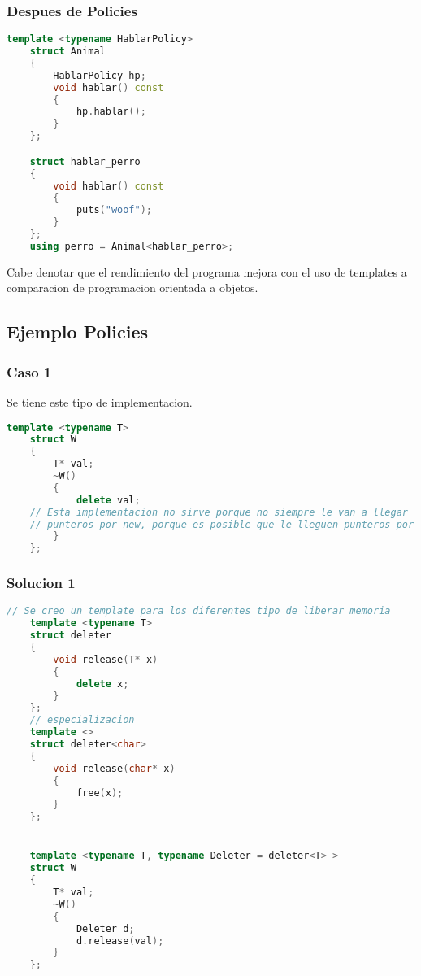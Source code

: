 \subsubsection{Despues de Policies}
\begin{lstlisting}[language=C++, caption={Using Policies}]
    template <typename HablarPolicy>
    struct Animal
    {
        HablarPolicy hp;
        void hablar() const
        {
            hp.hablar();
        }
    };

    struct hablar_perro
    {
        void hablar() const
        {
            puts("woof");
        }
    };
    using perro = Animal<hablar_perro>;
\end{lstlisting}


Cabe denotar que el rendimiento del programa mejora con el uso de templates
a comparacion de programacion orientada a objetos.

\subsection{Ejemplo Policies}

\subsubsection*{Caso 1}
Se tiene este tipo de implementacion.
\begin{lstlisting}[language=C++, caption={Solucion no generica}]
    template <typename T>
    struct W
    {
        T* val;
        ~W()
        {
            delete val;
    // Esta implementacion no sirve porque no siempre le van a llegar 
    // punteros por new, porque es posible que le lleguen punteros por malloc
        }
    };
\end{lstlisting}

\subsubsection*{Solucion 1}

\begin{lstlisting}[language=C++, caption={Policies example}]
    // Se creo un template para los diferentes tipo de liberar memoria
    template <typename T>
    struct deleter
    {
        void release(T* x)
        {
            delete x;
        }
    };
    // especializacion
    template <>
    struct deleter<char>
    {
        void release(char* x)
        {
            free(x);
        }
    };


    template <typename T, typename Deleter = deleter<T> >
    struct W
    {
        T* val;
        ~W()
        {
            Deleter d;
            d.release(val);
        }
    };
\end{lstlisting}
